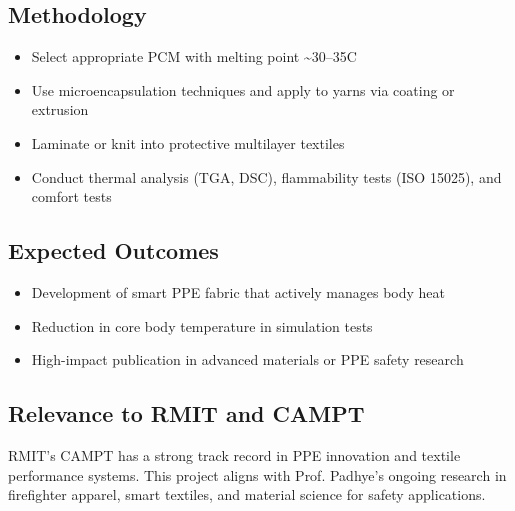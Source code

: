 \documentclass[12pt]{article}
\begin{document}
\subsection*{Methodology}
\begin{itemize}[noitemsep]
    \item Select appropriate PCM with melting point \textasciitilde 30--35\textdegree C
    \item Use microencapsulation techniques and apply to yarns via coating or extrusion
    \item Laminate or knit into protective multilayer textiles
    \item Conduct thermal analysis (TGA, DSC), flammability tests (ISO 15025), and comfort tests
\end{itemize}

\subsection*{Expected Outcomes}
\begin{itemize}[noitemsep]
    \item Development of smart PPE fabric that actively manages body heat
    \item Reduction in core body temperature in simulation tests
    \item High-impact publication in advanced materials or PPE safety research
\end{itemize}

\subsection*{Relevance to RMIT and CAMPT}
RMIT's CAMPT has a strong track record in PPE innovation and textile performance systems. This project aligns with Prof. Padhye's ongoing research in firefighter apparel, smart textiles, and material science for safety applications.
\end{document}
